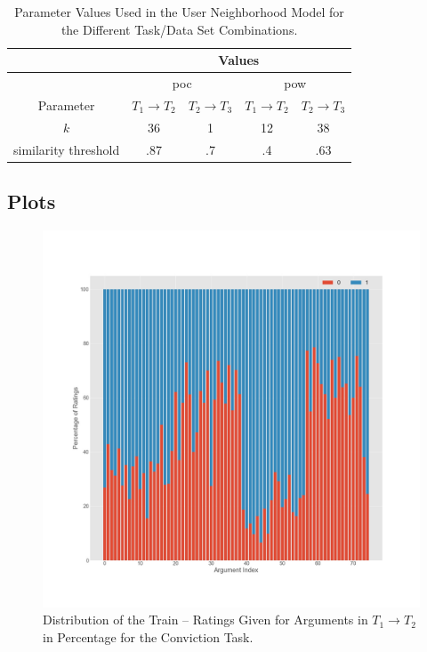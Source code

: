 \begin{table}[h!]
    \centering
    \begin{tabular}{|c|c|c|c|c|}
        \hline
         & \multicolumn{4}{|c|}{Values} \\
        \hline & \multicolumn{2}{|c|}{\acrshort{poc}} & \multicolumn{2}{|c|}{\acrshort{pow}} \\
        \hline Parameter & $T_1 \to T_2$  & $T_2 \to T_3$  & $T_1 \to T_2$  & $T_2 \to T_3$ \\
        \hline  $k$ & 36 & 1 & 12 & 38\\
          similarity threshold & .87 & .7 & .4 & .63\\
        \hline
    \end{tabular}
    \caption{Parameter Values Used in the User Neighborhood Model for the Different Task/Data Set Combinations.}
    \label{tab:autorec}
\end{table}
\clearpage

\subsection{Plots}
\label{sec:plots}

\begin{figure}[!ht]
    \centering
    \includegraphics[width=1\textwidth]{images/T1_T2_train_Conviction.jpg}
    \caption{Distribution of the Train – Ratings Given for Arguments in $T_1 \to T_2$ in Percentage for the Conviction Task.}
    \label{fig:conviction_t1_t2_train}
\end{figure}

